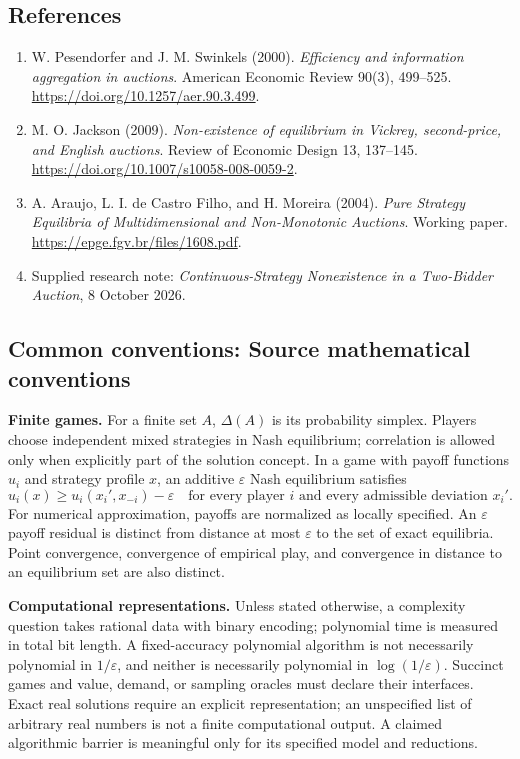\documentclass[11pt,a4paper]{article}
\begin{document}
\subsection*{References}

\begin{enumerate}
	\item[S1] W. Pesendorfer and J. M. Swinkels (2000).
	\emph{Efficiency and information aggregation in auctions}.
	American Economic Review 90(3), 499--525.
	\url{https://doi.org/10.1257/aer.90.3.499}.
	\item[S2] M. O. Jackson (2009).
	\emph{Non-existence of equilibrium in Vickrey, second-price, and
		English auctions}. Review of Economic Design 13, 137--145.
	\url{https://doi.org/10.1007/s10058-008-0059-2}.
	\item[S3] A. Araujo, L. I. de Castro Filho, and H. Moreira (2004).
	\emph{Pure Strategy Equilibria of Multidimensional and Non-Monotonic
		Auctions}. Working paper. \url{https://epge.fgv.br/files/1608.pdf}.
	\item[S4] Supplied research note: \emph{Continuous-Strategy
		Nonexistence in a Two-Bidder Auction}, 8 October 2026.
\end{enumerate}



\subsection*{Common conventions: Source mathematical conventions}

\textbf{Finite games.} For a finite set $A$, $\Delta(A)$ is its probability
simplex. Players choose independent mixed strategies in Nash equilibrium;
correlation is allowed only when explicitly part of the solution concept.
In a game with payoff functions $u_i$ and strategy profile $x$, an additive
$\varepsilon$ Nash equilibrium satisfies
\[
 u_i(x)\geq u_i(x_i',x_{-i})-\varepsilon
 \quad\text{for every player $i$ and every admissible deviation $x_i'$}.
\]
For numerical approximation, payoffs are normalized as locally specified.
An $\varepsilon$ payoff residual is distinct from distance at most
$\varepsilon$ to the set of exact equilibria. Point convergence, convergence
of empirical play, and convergence in distance to an equilibrium set are
also distinct.

\textbf{Computational representations.} Unless stated otherwise, a complexity
question takes rational data with binary encoding; polynomial time is measured
in total bit length. A fixed-accuracy polynomial algorithm is not necessarily
polynomial in $1/\varepsilon$, and neither is necessarily polynomial in
$\log(1/\varepsilon)$. Succinct games and value, demand, or sampling oracles
must declare their interfaces. Exact real solutions require an explicit
representation; an unspecified list of arbitrary real numbers is not a
finite computational output. A claimed algorithmic barrier is meaningful
only for its specified model and reductions.
\end{document}
